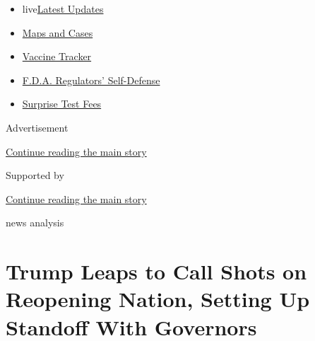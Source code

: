 \begin{itemize}
\tightlist
\item
  live\href{https://www.nytimes3xbfgragh.onion/2020/09/11/world/covid-19-coronavirus.html?name=styln-coronavirus-national\&region=TOP_BANNER\&block=storyline_menu_recirc\&action=click\&pgtype=Article\&impression_id=7bb59c30-f4bc-11ea-bc13-db3a9dba292a\&variant=undefined}{Latest
  Updates}
\item
  \href{https://www.nytimes3xbfgragh.onion/interactive/2020/us/coronavirus-us-cases.html?name=styln-coronavirus-national\&region=TOP_BANNER\&block=storyline_menu_recirc\&action=click\&pgtype=Article\&impression_id=7bb59c31-f4bc-11ea-bc13-db3a9dba292a\&variant=undefined}{Maps
  and Cases}
\item
  \href{https://www.nytimes3xbfgragh.onion/interactive/2020/science/coronavirus-vaccine-tracker.html?name=styln-coronavirus-national\&region=TOP_BANNER\&block=storyline_menu_recirc\&action=click\&pgtype=Article\&impression_id=7bb59c32-f4bc-11ea-bc13-db3a9dba292a\&variant=undefined}{Vaccine
  Tracker}
\item
  \href{https://www.nytimes3xbfgragh.onion/2020/09/10/us/politics/fda-coronavirus-vaccine.html?name=styln-coronavirus-national\&region=TOP_BANNER\&block=storyline_menu_recirc\&action=click\&pgtype=Article\&impression_id=7bb59c33-f4bc-11ea-bc13-db3a9dba292a\&variant=undefined}{F.D.A.
  Regulators' Self-Defense}
\item
  \href{https://www.nytimes3xbfgragh.onion/2020/09/09/upshot/coronavirus-surprise-test-fees.html?name=styln-coronavirus-national\&region=TOP_BANNER\&block=storyline_menu_recirc\&action=click\&pgtype=Article\&impression_id=7bb5c340-f4bc-11ea-bc13-db3a9dba292a\&variant=undefined}{Surprise
  Test Fees}
\end{itemize}

Advertisement

\protect\hyperlink{after-top}{Continue reading the main story}

Supported by

\protect\hyperlink{after-sponsor}{Continue reading the main story}

news analysis

\hypertarget{trump-leaps-to-call-shots-on-reopening-nation-setting-up-standoff-with-governors}{%
\section{Trump Leaps to Call Shots on Reopening Nation, Setting Up
Standoff With
Governors}\label{trump-leaps-to-call-shots-on-reopening-nation-setting-up-standoff-with-governors}}

